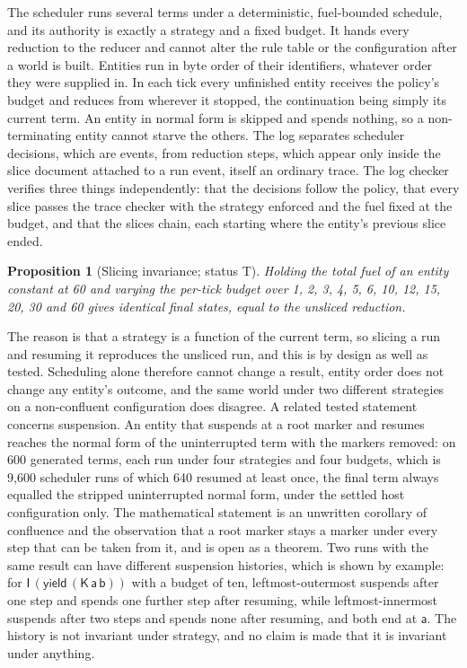 \documentclass[11pt]{article}
\newtheorem{proposition}[theorem]{Proposition}
\theoremstyle{definition}
\theoremstyle{remark}
\newcommand{\cI}{\mathsf{I}}
\newcommand{\cK}{\mathsf{K}}
\newcommand{\Tt}{status T}
\begin{document}
The scheduler runs several terms under a deterministic, fuel-bounded schedule, and its authority is exactly a strategy and a fixed budget. It hands every reduction to the reducer and cannot alter the rule table or the configuration after a world is built. Entities run in byte order of their identifiers, whatever order they were supplied in. In each tick every unfinished entity receives the policy's budget and reduces from wherever it stopped, the continuation being simply its current term. An entity in normal form is skipped and spends nothing, so a non-terminating entity cannot starve the others. The log separates scheduler decisions, which are events, from reduction steps, which appear only inside the slice document attached to a run event, itself an ordinary trace. The log checker verifies three things independently: that the decisions follow the policy, that every slice passes the trace checker with the strategy enforced and the fuel fixed at the budget, and that the slices chain, each starting where the entity's previous slice ended.

\begin{proposition}[Slicing invariance; \Tt]\label{prop:slicing}
Holding the total fuel of an entity constant at 60 and varying the per-tick budget over 1, 2, 3, 4, 5, 6, 10, 12, 15, 20, 30 and 60 gives identical final states, equal to the unsliced reduction.
\end{proposition}

The reason is that a strategy is a function of the current term, so slicing a run and resuming it reproduces the unsliced run, and this is by design as well as tested. Scheduling alone therefore cannot change a result, entity order does not change any entity's outcome, and the same world under two different strategies on a non-confluent configuration does disagree. A related tested statement concerns suspension. An entity that suspends at a root marker and resumes reaches the normal form of the uninterrupted term with the markers removed: on 600 generated terms, each run under four strategies and four budgets, which is 9{,}600 scheduler runs of which 640 resumed at least once, the final term always equalled the stripped uninterrupted normal form, under the settled host configuration only. The mathematical statement is an unwritten corollary of confluence and the observation that a root marker stays a marker under every step that can be taken from it, and is open as a theorem. Two runs with the same result can have different suspension histories, which is shown by example: for $\cI\,(\mathsf{yield}\,(\cK\,\mathsf a\,\mathsf b))$ with a budget of ten, leftmost-outermost suspends after one step and spends one further step after resuming, while leftmost-innermost suspends after two steps and spends none after resuming, and both end at $\mathsf a$. The history is not invariant under strategy, and no claim is made that it is invariant under anything.
\end{document}
